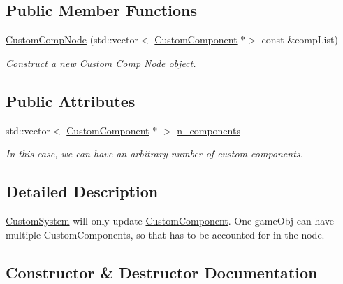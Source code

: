 \subsection*{Public Member Functions}
\begin{DoxyCompactItemize}
\item 
\hyperlink{structCustomCompNode_aad97992d43d962acbb3662a9af2a7d68}{Custom\+Comp\+Node} (std\+::vector$<$ \hyperlink{classCustomComponent}{Custom\+Component} $\ast$$>$ const \&comp\+List)
\begin{DoxyCompactList}\small\item\em Construct a new Custom Comp Node object. \end{DoxyCompactList}\end{DoxyCompactItemize}
\subsection*{Public Attributes}
\begin{DoxyCompactItemize}
\item 
\mbox{\label{structCustomCompNode_a96e3609cd8ee658e78951d46e968ef49}} 
std\+::vector$<$ \hyperlink{classCustomComponent}{Custom\+Component} $\ast$ $>$ \hyperlink{structCustomCompNode_a96e3609cd8ee658e78951d46e968ef49}{n\+\_\+components}
\begin{DoxyCompactList}\small\item\em In this case, we can have an arbitrary number of custom components. \end{DoxyCompactList}\end{DoxyCompactItemize}


\subsection{Detailed Description}
\hyperlink{classCustomSystem}{Custom\+System} will only update \hyperlink{classCustomComponent}{Custom\+Component}. One game\+Obj can have multiple Custom\+Components, so that has to be accounted for in the node. 

\subsection{Constructor \& Destructor Documentation}
\mbox{\label{structCustomCompNode_aad97992d43d962acbb3662a9af2a7d68}} 
